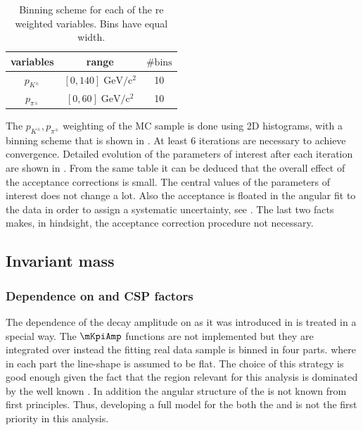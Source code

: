 \begin{table}[!h]
  \center
  \begin{tabular}{c c c}
    \hline
     variables & range & $\# \text{bins}$ \\
    \hline
    $p_{K^{\pm}}$    &  $[0,140]    \;  \text{GeV}/\text{c}^2$  & 10      \\ 
    $p_{\pi^{\pm}}$  &  $[0,60]      \;  \text{GeV}/\text{c}^2$  & 10      \\ 
    \hline
  \end{tabular}
  \caption{\small Binning scheme for each of the re weighted variables. Bins have equal width.}
  \label{angAccBinning}
\end{table}

The $p_{K^{\pm}},p_{\pi^{\mp}}$ weighting of the MC sample is done using 2D histograms, with a binning scheme that is shown in . 
At least 6 iterations are necessary to achieve convergence. Detailed evolution of the parameters of interest after each iteration are shown in
. From the same table it can be deduced that the overall effect of the acceptance corrections is small. The central
values of the parameters of interest does not change a lot. Also the acceptance is floated in the angular fit to the data in order to assign
a systematic uncertainty, see . The last two facts makes, in hindsight, the acceptance correction procedure not necessary. 


\subsection{\Kpi Invariant mass}
\label{Kpi_Invariant_mass}

\subsubsection{Dependence on \mkpi and CSP factors}
The dependence of the \BJpsiKpi decay amplitude on \mkpi as it was introduced in  is treated in a special way.
The $\mKpiAmp$ functions are not implemented but they are integrated over \mkpi instead the fitting real data sample is binned in four parts.
where in each part the \mkpi line-shape is assumed to be flat.
The choice of this strategy is good enough given the fact that the \mkpi region relevant for this analysis is dominated by the well
known \pwave. In addition the angular structure of the \swave is not known from first principles. Thus, developing a full model for the both
the \pwave and \swave is not the first priority in this analysis.

